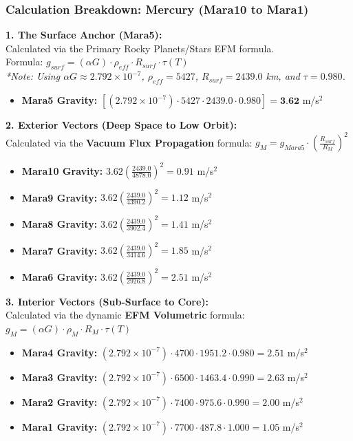 \documentclass[11pt, a4paper]{article}
\begin{document}
\clearpage
\subsubsection{Calculation Breakdown: Mercury (Mara10 to Mara1)}

\noindent \textbf{1. The Surface Anchor (Mara5):} \\
Calculated via the Primary Rocky Planets/Stars EFM formula. \\
Formula: $g_{surf} = (\alpha G) \cdot \rho_{eff} \cdot R_{surf} \cdot \tau(T)$ \\
\textit{*Note: Using $\alpha G \approx 2.792 \times 10^{-7}$, $\rho_{eff} = 5427$, $R_{surf} = 2439.0$ km, and $\tau = 0.980$.}
\begin{itemize}
  \item \textbf{Mara5 Gravity:} $\left[ (2.792 \times 10^{-7}) \cdot 5427 \cdot 2439.0 \cdot 0.980 \right] = \textbf{3.62}$ m/s$^2$
\end{itemize}

\vspace{0.5em}
\noindent \textbf{2. Exterior Vectors (Deep Space to Low Orbit):} \\
Calculated via the \textbf{Vacuum Flux Propagation} formula: $g_M = g_{Mara5} \cdot \left( \frac{R_{surf}}{R_M} \right)^2$
\begin{itemize}
  \item \textbf{Mara10 Gravity:} $3.62 \left( \frac{2439.0}{4878.0} \right)^2 = 0.91$ m/s$^2$
  \item \textbf{Mara9 Gravity:} $3.62 \left( \frac{2439.0}{4390.2} \right)^2 = 1.12$ m/s$^2$
  \item \textbf{Mara8 Gravity:} $3.62 \left( \frac{2439.0}{3902.4} \right)^2 = 1.41$ m/s$^2$
  \item \textbf{Mara7 Gravity:} $3.62 \left( \frac{2439.0}{3414.6} \right)^2 = 1.85$ m/s$^2$
  \item \textbf{Mara6 Gravity:} $3.62 \left( \frac{2439.0}{2926.8} \right)^2 = 2.51$ m/s$^2$
\end{itemize}

\vspace{0.5em}
\noindent \textbf{3. Interior Vectors (Sub-Surface to Core):} \\
Calculated via the dynamic \textbf{EFM Volumetric} formula: $g_M = (\alpha G) \cdot \rho_{M} \cdot R_M \cdot \tau(T)$
\begin{itemize}
  \item \textbf{Mara4 Gravity:} $(2.792 \times 10^{-7}) \cdot 4700 \cdot 1951.2 \cdot 0.980 = 2.51$ m/s$^2$
  \item \textbf{Mara3 Gravity:} $(2.792 \times 10^{-7}) \cdot 6500 \cdot 1463.4 \cdot 0.990 = 2.63$ m/s$^2$
  \item \textbf{Mara2 Gravity:} $(2.792 \times 10^{-7}) \cdot 7400 \cdot 975.6 \cdot 0.990 = 2.00$ m/s$^2$
  \item \textbf{Mara1 Gravity:} $(2.792 \times 10^{-7}) \cdot 7700 \cdot 487.8 \cdot 1.000 = 1.05$ m/s$^2$
\end{itemize}
\end{document}
